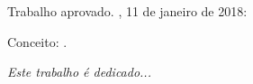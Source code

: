 \documentclass[
	12pt,				%
	openright,			%
	oneside,			%
	a4paper,			%
	english,			%
	brazil				%
	]{abntex2}
\begin{document}
%
% 
%
\begin{folhadeaprovacao}

  \begin{center}
    {\ABNTEXchapterfont\large\imprimirautor}

    \vspace*{\fill}\vspace*{\fill}
    \begin{center}
      \ABNTEXchapterfont\bfseries\Large\imprimirtitulo
    \end{center}
    \vspace*{\fill}
    
    \hspace{.45\textwidth}
    \begin{minipage}{.5\textwidth}
        \imprimirpreambulo
    \end{minipage}%
    \vspace*{\fill}
   \end{center}
        
   Trabalho aprovado. \imprimirlocal, 11 de janeiro de 2018:

   Conceito: .
   
      
   \begin{center}
    \vspace*{0.5cm}
    {\large\imprimirlocal}
    \par
    {\large\imprimirdata}
    \vspace*{1cm}
  \end{center}
  
\end{folhadeaprovacao}

\begin{dedicatoria}
   \vspace*{\fill}
   \centering
   \noindent
   \textit{ Este trabalho é dedicado...} \vspace*{\fill}
\end{dedicatoria}
\end{document}
